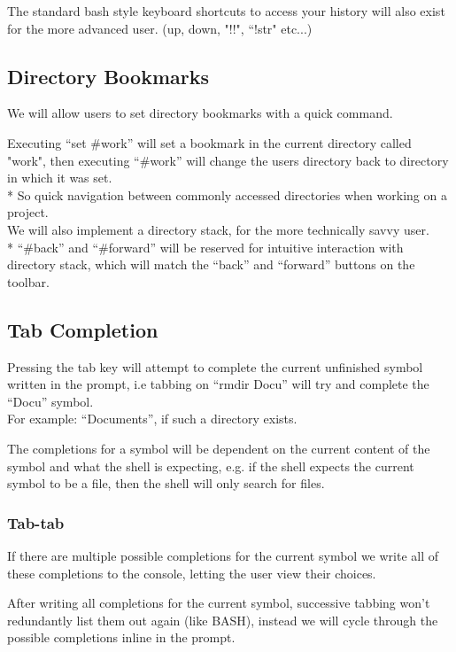 \documentclass[a4paper,12pt]{article}
\begin{document}
The standard bash style keyboard shortcuts to access your history will also exist for the
more advanced user. (up, down, "!!", ``!str" etc...)

\subsection*{Directory Bookmarks}
We will allow users to set directory bookmarks with a quick command.

Executing ``set \#work'' will set a bookmark in the current directory called "work", then executing ``\#work'' will change the users directory back to directory in which it was set.\\*
So quick navigation between commonly accessed directories when working on a project.\\[0.5cm]
We will also implement a directory stack, for the more technically savvy user.\\*
``\#back'' and ``\#forward'' will be reserved for intuitive interaction with  directory stack, which will match the ``back'' and ``forward'' buttons on the toolbar.


\pagebreak
\subsection*{Tab Completion}

Pressing the tab key will attempt to complete the current unfinished symbol written in the prompt, i.e tabbing on ``rmdir Docu'' will try and complete the ``Docu'' symbol.\\
For example: ``Documents'', if such a directory exists.

The completions for a symbol will be dependent on the current content of the symbol and what the shell is expecting, e.g. if the shell expects the current symbol to be a file, then the shell will only search for files.

\subsubsection*{Tab-tab}
If there are multiple possible completions for the current symbol we write all of these completions to the console, letting the user view their choices.

After writing all completions for the current symbol, successive tabbing  won't redundantly list them out again (like BASH), instead we will cycle through the possible completions inline in the prompt.  
\end{document}
